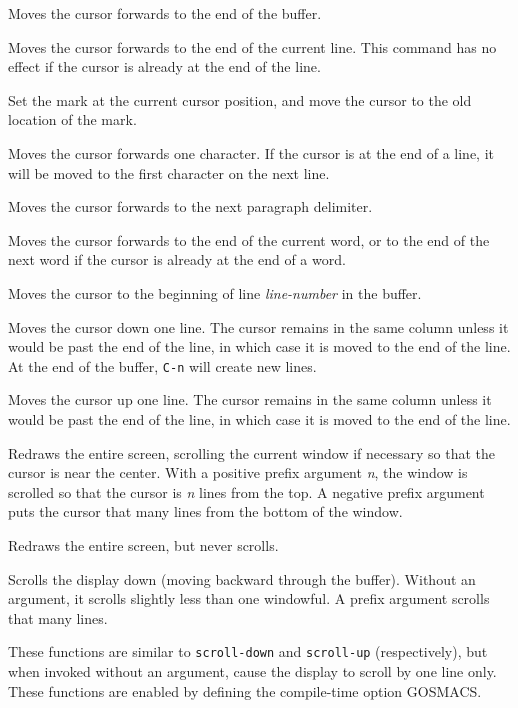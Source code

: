 \fbody Moves the cursor forwards to the end of the buffer.

\fbody Moves the cursor forwards to the end of the current line.  This
command has no effect if the cursor is already at the end of the line.

\fbody Set the mark at the current cursor position, and move the cursor
to the old location of the mark.

\fbody Moves the cursor forwards one character.  If the cursor is at the
end of a line, it will be moved to the first character on the next line.

\fname{forward-paragraph}{}{M-]}
\fbody Moves the cursor forwards to the next paragraph delimiter.

\fbody Moves the cursor forwards to the end of the current word, or to
the end of the next word if the cursor is already at the end of a word.

\fbody Moves the cursor to the beginning of line {\em line-number\/} in
the buffer.

\fbody Moves the cursor down one line.  The cursor remains in the same
column unless it would be past the end of the line, in which case it is
moved to the end of the line.  At the end of the buffer, {\tt C-n} will
create new lines.

\fbody Moves the cursor up one line.    The cursor remains in the same
column unless it would be past the end of the line, in which case it is
moved to the end of the line.

\fbody Redraws the entire screen, scrolling the current window if necessary
so that the cursor is near the center.  With a positive prefix argument 
{\em n\/}, the window is scrolled so that the cursor is {\em n\/} lines
from the top.  A negative prefix argument puts the cursor that many lines
from the bottom of the window.

\fbody Redraws the entire screen, but never scrolls.

\fbody Scrolls the display down (moving backward through the
buffer).  Without 
an argument, it scrolls slightly less than one windowful.  A prefix argument
scrolls that many lines.

\fbody These functions are similar to {\tt scroll-down} and {\tt scroll-up}
(respectively), but when invoked without an argument, cause the display 
to scroll by one line only.  These functions are enabled by defining the
compile-time option GOSMACS.

